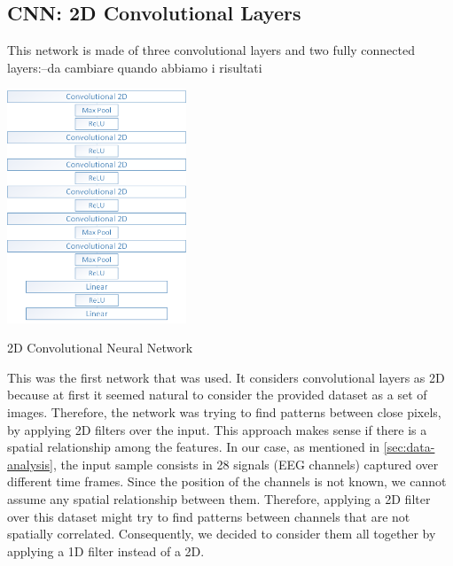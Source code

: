 \documentclass[10pt,conference,compsocconf]{IEEEtran}
\begin{document}
\subsection{CNN: 2D Convolutional Layers}
This network is made of three convolutional layers and two fully connected layers:--da cambiare quando abbiamo i risultati

\begin{center}
	\captionsetup{type=figure}
	\includegraphics[width=0.4\textwidth]{img/Conv2D.png}
	\label{fig:Conv2D}
	\caption {2D Convolutional Neural Network}
\end{center}


This was the first network that was used. It considers convolutional layers as 2D because at first it seemed natural to consider the provided dataset as a set of images. Therefore, the network was trying to find patterns between close pixels, by applying 2D filters over the input. This approach makes sense if there is a spatial relationship among the features. In our case, as mentioned in \ref{sec:data-analysis}, the input sample consists in 28 signals (EEG channels) captured over different time frames. Since the position of the channels is not known, we cannot assume any spatial relationship between them. Therefore, applying a 2D filter over this dataset might try to find patterns between channels that are not spatially correlated. Consequently, we decided to consider them all together by applying a 1D filter instead of a 2D. 
\end{document}
